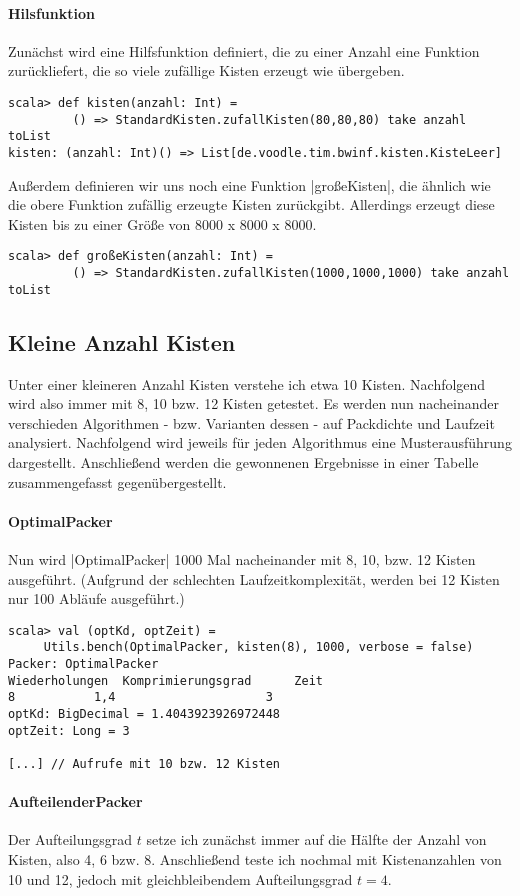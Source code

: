 \paragraph{Hilsfunktion}
 Zunächst wird eine Hilfsfunktion definiert, die zu einer Anzahl eine Funktion zurückliefert, die so viele zufällige Kisten erzeugt wie übergeben.
\begin{lstlisting}
scala> def kisten(anzahl: Int) =
         () => StandardKisten.zufallKisten(80,80,80) take anzahl toList
kisten: (anzahl: Int)() => List[de.voodle.tim.bwinf.kisten.KisteLeer]
\end{lstlisting}
 Außerdem definieren wir uns noch eine Funktion |großeKisten|, die ähnlich wie die obere Funktion zufällig erzeugte Kisten zurückgibt.
 Allerdings erzeugt diese Kisten bis zu einer Größe von 8000 x 8000 x 8000.
\begin{lstlisting}
scala> def großeKisten(anzahl: Int) =
         () => StandardKisten.zufallKisten(1000,1000,1000) take anzahl toList
\end{lstlisting}

\subsection{Kleine Anzahl Kisten}
\label{optAlg}
 Unter einer kleineren Anzahl Kisten verstehe ich etwa 10 Kisten. Nachfolgend wird also immer mit 8, 10 bzw. 12 Kisten getestet.
 Es werden nun nacheinander verschieden Algorithmen - bzw. Varianten dessen - auf Packdichte und Laufzeit analysiert.
 Nachfolgend wird jeweils für jeden Algorithmus eine Musterausführung dargestellt.
 Anschließend werden die gewonnenen Ergebnisse in einer Tabelle zusammengefasst gegenübergestellt.
\paragraph{OptimalPacker}
 Nun wird |OptimalPacker| 1000 Mal nacheinander mit 8, 10, bzw. 12 Kisten ausgeführt.
 (Aufgrund der schlechten Laufzeitkomplexität, werden bei 12 Kisten nur 100 Abläufe ausgeführt.)
\begin{lstlisting}
scala> val (optKd, optZeit) =
	 Utils.bench(OptimalPacker, kisten(8), 1000, verbose = false)
Packer: OptimalPacker
Wiederholungen  Komprimierungsgrad      Zeit
8       	1,4                     3
optKd: BigDecimal = 1.4043923926972448
optZeit: Long = 3

[...] // Aufrufe mit 10 bzw. 12 Kisten
\end{lstlisting}
\paragraph{AufteilenderPacker}
Der Aufteilungsgrad $t$ setze ich zunächst immer auf die Hälfte der Anzahl von Kisten, also 4, 6 bzw. 8.
Anschließend teste ich nochmal mit Kistenanzahlen von 10 und 12, jedoch mit gleichbleibendem Aufteilungsgrad $t = 4$.

